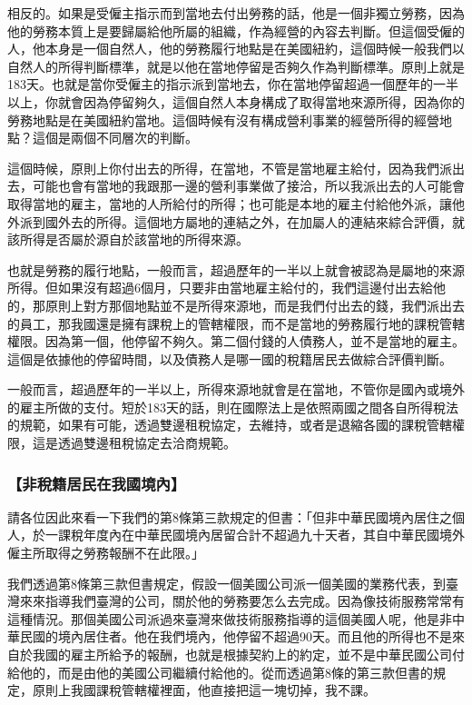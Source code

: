 \documentclass[oneside,sub3section]{ctexbook}
\begin{document}
相反的。如果是受僱主指示而到當地去付出勞務的話，他是一個非獨立勞務，因為他的勞務本質上是要歸屬給他所屬的組織，作為經營的內容去判斷。但這個受僱的人，他本身是一個自然人，他的勞務履行地點是在美國紐約，這個時候一般我們以自然人的所得判斷標準，就是以他在當地停留是否夠久作為判斷標準。原則上就是183天。也就是當你受僱主的指示派到當地去，你在當地停留超過一個歷年的一半以上，你就會因為停留夠久，這個自然人本身構成了取得當地來源所得，因為你的勞務地點是在美國紐約當地。這個時候有沒有構成營利事業的經營所得的經營地點？這個是兩個不同層次的判斷。

這個時候，原則上你付出去的所得，在當地，不管是當地雇主給付，因為我們派出去，可能也會有當地的我跟那一邊的營利事業做了接洽，所以我派出去的人可能會取得當地的雇主，當地的人所給付的所得；也可能是本地的雇主付給他外派，讓他外派到國外去的所得。這個地方屬地的連結之外，在加屬人的連結來綜合評價，就該所得是否屬於源自於該當地的所得來源。

也就是勞務的履行地點，一般而言，超過歷年的一半以上就會被認為是屬地的來源所得。但如果沒有超過6個月，只要非由當地雇主給付的，我們這邊付出去給他的，那原則上對方那個地點並不是所得來源地，而是我們付出去的錢，我們派出去的員工，那我國還是擁有課稅上的管轄權限，而不是當地的勞務履行地的課稅管轄權限。因為第一個，他停留不夠久。第二個付錢的人債務人，並不是當地的雇主。這個是依據他的停留時間，以及債務人是哪一國的稅籍居民去做綜合評價判斷。

一般而言，超過歷年的一半以上，所得來源地就會是在當地，不管你是國內或境外的雇主所做的支付。短於183天的話，則在國際法上是依照兩國之間各自所得稅法的規範，如果有可能，透過雙邊租稅協定，去維持，或者是退縮各國的課稅管轄權限，這是透過雙邊租稅協定去洽商規範。

\hypertarget{ux975eux7a05ux7c4dux5c45ux6c11ux5728ux6211ux570bux5883ux5167}{%
\subsubsection{【非稅籍居民在我國境內】}\label{ux975eux7a05ux7c4dux5c45ux6c11ux5728ux6211ux570bux5883ux5167}}

請各位因此來看一下我們的第8條第三款規定的但書：「但非中華民國境內居住之個人，於一課稅年度內在中華民國境內居留合計不超過九十天者，其自中華民國境外僱主所取得之勞務報酬不在此限。」

我們透過第8條第三款但書規定，假設一個美國公司派一個美國的業務代表，到臺灣來來指導我們臺灣的公司，關於他的勞務要怎么去完成。因為像技術服務常常有這種情況。那個美國公司派過來臺灣來做技術服務指導的這個美國人呢，他是非中華民國的境內居住者。他在我們境內，他停留不超過90天。而且他的所得也不是來自於我國的雇主所給予的報酬，也就是根據契約上的約定，並不是中華民國公司付給他的，而是由他的美國公司繼續付給他的。從而透過第8條的第三款但書的規定，原則上我國課稅管轄權裡面，他直接把這一塊切掉，我不課。
\end{document}
